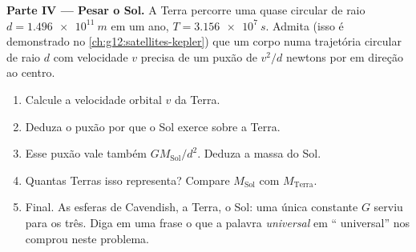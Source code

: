 \begin{problem}
\medskip
\noindent\textbf{Parte IV --- Pesar o Sol.}
A Terra percorre uma  quase circular de raio
$d = \qty{1.496e11}{m}$ em um ano, $T = \qty{3.156e7}{s}$. Admita (isso é
demonstrado no \cref{ch:g12:satellites-kepler}) que um corpo numa
trajetória circular de raio $d$ com velocidade $v$ precisa de um puxão de
$v^2/d$ newtons por  em direção ao centro.
\begin{enumerate}[resume]
  \item Calcule a velocidade orbital $v$ da Terra.
  \item Deduza o puxão por  que o Sol exerce sobre a Terra.
  \item Esse puxão vale também $G M_{\text{Sol}} / d^2$. Deduza a massa
        do Sol.
  \item Quantas Terras isso representa? Compare $M_{\text{Sol}}$ com
        $M_{\text{Terra}}$.
  \item Final. As esferas de Cavendish, a Terra, o Sol: uma única
        constante $G$ serviu para os três. Diga em uma frase o que a
        palavra \emph{universal} em `` universal'' nos comprou
        neste problema.
\end{enumerate}
\end{problem}

